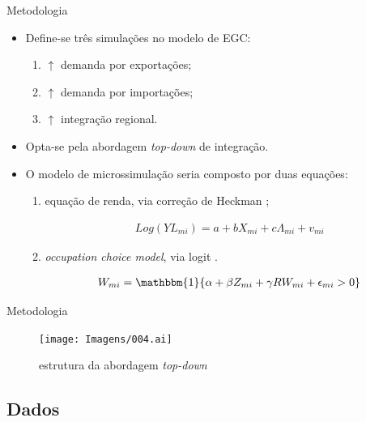 \documentclass[10pt]{sintefbeamer}
\begin{document}
\begin{frame}{Metodologia}
	\begin{itemize}[<+->]
		
		\item Define-se três simulações no modelo de EGC:
		
		\begin{enumerate}
			\item $\uparrow$ demanda por exportações;
			\item $\uparrow$ demanda por importações;
			\item $\uparrow$ integração regional.
		\end{enumerate}
		
		\item Opta-se pela abordagem \textit{top-down} de integração.
		
		\item O modelo de microssimulação seria composto por duas equações:
		
		\begin{enumerate}
			\item equação de renda, via correção de Heckman \cite{colombo08};
			
			\begin{align*}
				Log(YL_{mi}) = a + bX_{mi} + c \Lambda_{mi} + v_{mi}
			\end{align*}
			
			\item \textit{occupation choice model}, via logit \cite{colombo08}.
			
			\begin{align*}
				W_{mi} = \mathbbm{1}\{\alpha + \beta Z_{mi} + \gamma RW_{mi} + \epsilon_{mi} > 0\}
			\end{align*}
		\end{enumerate}
	\end{itemize}
\end{frame}

\begin{frame}{Metodologia}
	\begin{figure}
		\centering
		\texttt{[image: Imagens/004.ai]}
		\caption{estrutura da abordagem \textit{top-down}}
		\footnotesize
		\vspace{-0.2cm}
	\end{figure}
\end{frame}


\subsection[]{Dados}
\end{document}
